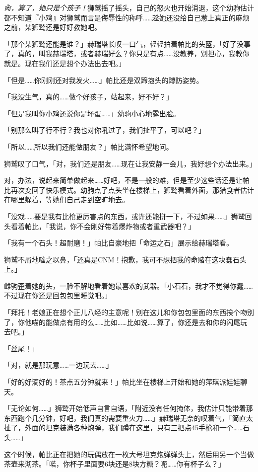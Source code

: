\emph{肏，算了，她只是个孩子！}狮鹫摇了摇头，自己的怒火也开始消退，这个幼驹估计都不知道『小鸡』对狮鹫而言是侮辱性的称呼……趁她还没给自己惹上真正的麻烦之前，某狮鹫还是好好教她吧。

「那个某狮鹫还能是谁？」赫瑞塔长叹一口气，轻轻拍着帕比的头盔，「好了没事了，真的，叫我赫瑞塔，或者赫瑞好么？你只是有点……没教养，别担心，我教你就是。现在我们还是想个办法出去吧。」

「但是……你刚刚还对我发火……」帕比还是双蹄抱头的蹲防姿势。

「我没生气，真的……做个好孩子，站起来，好不好？」

「但是我叫你小鸡还说你是坏蛋……」幼驹小心地露出脸。

「别那么叫了行不行？我也对你吼过了，我们扯平了，可以吧？」

「所以……所以我们还能做朋友？」帕比满怀希望地问。

狮鹫叹了口气，「对，我们还是朋友……现在让我安静一会儿，我好想个办法出来。」

对，办法，说起来简单做起来……好吧，不是一般的难，但是至少这些话还是让帕比再次变回了快乐模式。幼驹点了点头坐在楼梯上，狮鹫看着外面，那猎食者估计在哪里躲着，等她们自己走到空旷地去。

「没戏……要是我有比枪更厉害点的东西，或许还能拼一下，不过如果……」狮鹫回头看着帕比，「我说，你不会刚好带着爆炸物或者重武器吧？」

「我有一个石头！超耐磨！」帕比自豪地把「命运之石」展示给赫瑞塔看。

狮鹫不屑地嗤之以鼻，「还真是CNM！抱歉，我可不想把我的命赌在这块蠢石头上。」

雌驹歪着她的头，一脸不解地看着她最喜欢的武器。「小石石，我才不觉得你蠢……不过现在你还是回包包里睡觉吧。」

「拜托！老娘正在想个正儿八经的主意呢！别在这儿和你包包里面的东西挨个吻别了，你他喵的能做点有用的么……比如……比如说……算了，你还是去和你的闪尾玩去吧。」

「丝尾！」

「对，就是那玩意……一边玩去……」

「好的好滴好的！茶点五分钟就来！」帕比坐在楼梯上开始和她的萍琪派娃娃聊天。

「无论如何……」狮鹫开始低声自言自语，「附近没有任何掩体，我估计只能带着那东西跑个几分钟，好吧，我们真的需要重火力……」赫瑞塔无奈的叹着气，「简直太扯了，外面的坦克装满各种炮弹，我们蹲在这里，只有三把点45手枪和一个……石头……」


这个时候，帕比正在把她的玩偶放在一枚大号坦克炮弹弹头上，然后用另一个当做茶壶来沏茶。「喏，你杯子里面要6块还是8块方糖？呃……你有杯子么？」


